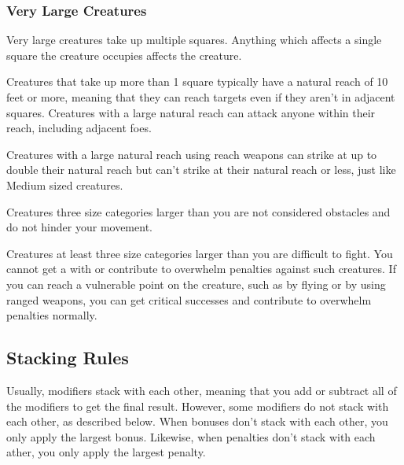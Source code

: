         \subsubsection{Very Large Creatures}
             Very large creatures take up multiple squares. Anything which affects a single square the creature occupies affects the creature.

             Creatures that take up more than 1 square typically have a natural reach of 10 feet or more, meaning that they can reach targets even if they aren't in adjacent squares. Creatures with a large natural reach can attack anyone within their reach, including adjacent foes.

            Creatures with a large natural reach using reach weapons can strike at up to double their natural reach but can't strike at their natural reach or less, just like Medium sized creatures.

             Creatures three size categories larger than you are not considered obstacles and do not hinder your movement.

             Creatures at least three size categories larger than you are difficult to fight. You cannot get a  with  or contribute to overwhelm penalties against such creatures. If you can reach a vulnerable point on the creature, such as by flying or by using ranged weapons, you can get critical successes and contribute to overwhelm penalties normally.

    \subsection{Stacking Rules}\label{Stacking Rules}
        Usually, modifiers stack with each other, meaning that you add or subtract all of the modifiers to get the final result. However, some modifiers do not stack with each other, as described below. When bonuses don't stack with each other, you only apply the largest bonus. Likewise, when penalties don't stack with each ather, you only apply the largest penalty.


